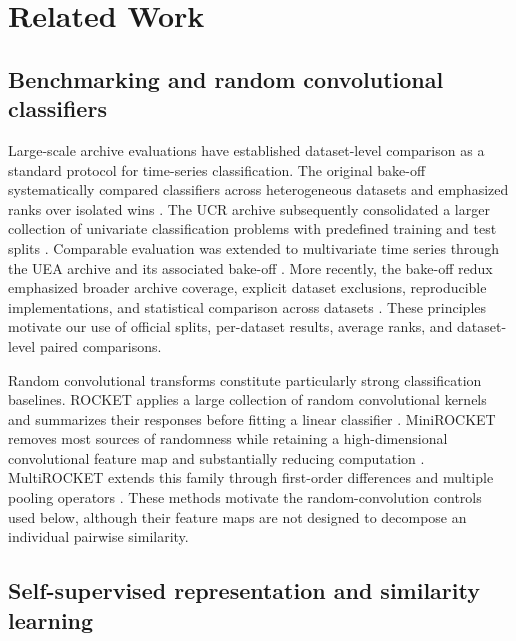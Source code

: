 \documentclass[pdflatex,sn-mathphys-num]{sn-jnl}
\newcommand{\1}{\mathbf{1}}
\theoremstyle{plain}
\begin{document}
	\section{Related Work}
	
	\subsection{Benchmarking and random convolutional classifiers}
	
	Large-scale archive evaluations have established dataset-level comparison as a standard protocol for time-series classification. The original bake-off systematically compared classifiers across heterogeneous datasets and emphasized ranks over isolated wins \cite{bagnall2017bakeoff}. The UCR archive subsequently consolidated a larger collection of univariate classification problems with predefined training and test splits \cite{dau2019ucr}. Comparable evaluation was extended to multivariate time series through the UEA archive and its associated bake-off \cite{ruiz2021uea}. More recently, the bake-off redux emphasized broader archive coverage, explicit dataset exclusions, reproducible implementations, and statistical comparison across datasets \cite{middlehurst2024redux}. These principles motivate our use of official splits, per-dataset results, average ranks, and dataset-level paired comparisons.
	
	Random convolutional transforms constitute particularly strong classification baselines. ROCKET applies a large collection of random convolutional kernels and summarizes their responses before fitting a linear classifier \cite{dempster2020rocket}. MiniROCKET removes most sources of randomness while retaining a high-dimensional convolutional feature map and substantially reducing computation \cite{dempster2021minirocket}. MultiROCKET extends this family through first-order differences and multiple pooling operators \cite{tan2022multirocket}. These methods motivate the random-convolution controls used below, although their feature maps are not designed to decompose an individual pairwise similarity.
	
	\subsection{Self-supervised representation and similarity learning}
	
\end{document}
